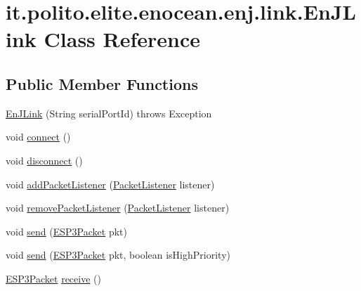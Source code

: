 \hypertarget{classit_1_1polito_1_1elite_1_1enocean_1_1enj_1_1link_1_1_en_j_link}{}\section{it.\+polito.\+elite.\+enocean.\+enj.\+link.\+En\+J\+Link Class Reference}
\label{classit_1_1polito_1_1elite_1_1enocean_1_1enj_1_1link_1_1_en_j_link}
\subsection*{Public Member Functions}
\begin{DoxyCompactItemize}
\item 
\hyperlink{classit_1_1polito_1_1elite_1_1enocean_1_1enj_1_1link_1_1_en_j_link_a226e37d4d44df6ac0916d314f9953bdd}{En\+J\+Link} (String serial\+Port\+Id)  throws Exception 	
\item 
void \hyperlink{classit_1_1polito_1_1elite_1_1enocean_1_1enj_1_1link_1_1_en_j_link_a52e5159c6f16b7fb9f54ccb438f53215}{connect} ()
\item 
void \hyperlink{classit_1_1polito_1_1elite_1_1enocean_1_1enj_1_1link_1_1_en_j_link_a1f2eb00fc4c2602f55529273ebb2e818}{disconnect} ()
\item 
void \hyperlink{classit_1_1polito_1_1elite_1_1enocean_1_1enj_1_1link_1_1_en_j_link_aaf409c57f5237c5752695b7e149f2977}{add\+Packet\+Listener} (\hyperlink{interfaceit_1_1polito_1_1elite_1_1enocean_1_1enj_1_1link_1_1_packet_listener}{Packet\+Listener} listener)
\item 
void \hyperlink{classit_1_1polito_1_1elite_1_1enocean_1_1enj_1_1link_1_1_en_j_link_aa1d6dad3b4b99efa4357844a4a16772f}{remove\+Packet\+Listener} (\hyperlink{interfaceit_1_1polito_1_1elite_1_1enocean_1_1enj_1_1link_1_1_packet_listener}{Packet\+Listener} listener)
\item 
void \hyperlink{classit_1_1polito_1_1elite_1_1enocean_1_1enj_1_1link_1_1_en_j_link_a8ac1d0adfde9fe7674be3a841bd17ccc}{send} (\hyperlink{classit_1_1polito_1_1elite_1_1enocean_1_1protocol_1_1serial_1_1v3_1_1network_1_1packet_1_1_e_s_p3_packet}{E\+S\+P3\+Packet} pkt)
\item 
void \hyperlink{classit_1_1polito_1_1elite_1_1enocean_1_1enj_1_1link_1_1_en_j_link_aa20997ac17e540b5f35cf9f8fdcde3c2}{send} (\hyperlink{classit_1_1polito_1_1elite_1_1enocean_1_1protocol_1_1serial_1_1v3_1_1network_1_1packet_1_1_e_s_p3_packet}{E\+S\+P3\+Packet} pkt, boolean is\+High\+Priority)
\item 
\hyperlink{classit_1_1polito_1_1elite_1_1enocean_1_1protocol_1_1serial_1_1v3_1_1network_1_1packet_1_1_e_s_p3_packet}{E\+S\+P3\+Packet} \hyperlink{classit_1_1polito_1_1elite_1_1enocean_1_1enj_1_1link_1_1_en_j_link_a11ba9e26a4304a5b2d8b4865b2ce8b90}{receive} ()
\end{DoxyCompactItemize}
